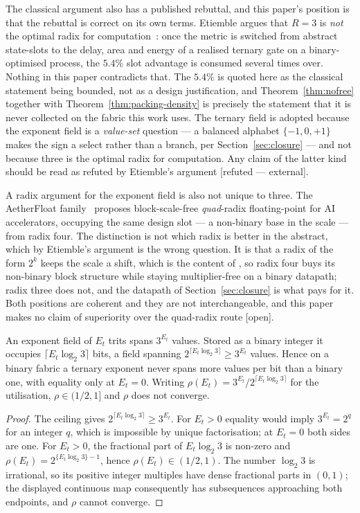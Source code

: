 The classical argument also has a published rebuttal, and this paper's position is
that the rebuttal is correct on its own terms. Etiemble argues that $R=3$ is
\emph{not} the optimal radix for computation~\cite{etiemble2019}: once the metric
is switched from abstract state-slots to the delay, area and energy of a realised
ternary gate on a binary-optimised process, the $5.4\%$ slot advantage is consumed
several times over. Nothing in this paper contradicts that. The $5.4\%$ is quoted
here as the classical statement being bounded, not as a design justification, and
Theorem~\ref{thm:nofree} together with Theorem~\ref{thm:packing-density} is
precisely the statement that it is never collected on the fabric this work uses.
The ternary field is adopted because the exponent field is a \emph{value-set}
question --- a balanced alphabet $\{-1,0,+1\}$ makes the sign a select rather than
a branch, per Section~\ref{sec:closure} --- and not because three is the optimal
radix for computation. Any claim of the latter kind should be read as refuted by
Etiemble's argument [refuted --- external].

A radix argument for the exponent field is also not unique to three. The
AetherFloat family~\cite{aetherfloat} proposes block-scale-free \emph{quad}-radix
floating-point for AI accelerators, occupying the same design slot --- a
non-binary base in the scale --- from radix four. The distinction is not which
radix is better in the abstract, which by Etiemble's argument is the wrong
question. It is that a radix of the form $2^{k}$ keeps the scale a shift, which is
the content of , so radix four buys its non-binary block
structure while staying multiplier-free on a binary datapath; radix three does
not, and the datapath of Section~\ref{sec:closure} is what pays for it. Both
positions are coherent and they are not interchangeable, and this paper makes no
claim of superiority over the quad-radix route [open].

\begin{theorem}
\label{thm:nofree}
An exponent field of $E_t$ trits spans $3^{E_t}$ values. Stored as a binary
integer it occupies $\lceil E_t\log_2 3\rceil$ bits, a field spanning
$2^{\lceil E_t\log_2 3\rceil} \geq 3^{E_t}$ values. Hence on a binary fabric a
ternary exponent never spans more values per bit than a binary one, with equality
only at $E_t = 0$. Writing $\rho(E_t) = 3^{E_t}/2^{\lceil E_t\log_2 3\rceil}$ for
the utilisation, $\rho \in (1/2, 1]$ and $\rho$ does not converge.
\end{theorem}
\begin{proof}
The ceiling gives $2^{\lceil E_t\log_2 3\rceil}\geq3^{E_t}$.  For
$E_t>0$ equality would imply $3^{E_t}=2^q$ for an integer $q$, which is
impossible by unique factorisation; at $E_t=0$ both sides are one.  For
$E_t>0$, the fractional part of $E_t\log_2 3$ is non-zero and
$\rho(E_t)=2^{\{E_t\log_2 3\}-1}$, hence $\rho(E_t)\in(1/2,1)$.  The number
$\log_2 3$ is irrational, so its positive integer multiples have dense
fractional parts in $(0,1)$; the displayed continuous map consequently has
subsequences approaching both endpoints, and $\rho$ cannot converge.
\end{proof}

